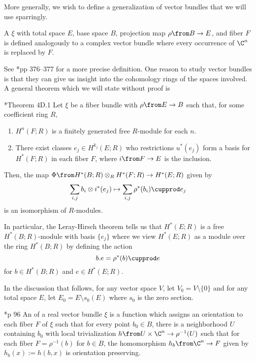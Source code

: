 \documentclass[11pt,leqno,oneside]{amsbook}
\numberwithin{thm}{section}
\begin{document}
More generally, we wish to define a generalization of vector bundles
that we will use sparringly.
\begin{defn}
   A  \(\xi\) with total space \(E\), base space
   \(B\), projection map \(\rho \from B \to E\), and fiber \(F\) is
   defined analogously to a complex vector bundle where every
   occurrence of \(\C^n\) is replaced by \(F\).
\end{defn}
See \cite{hatcher}*{pp 376--377} for a more precise definition. 
One reason to study vector bundles is that they can give us insight
into the cohomology rings of the spaces involved. A general theorem
which we will state without proof is
\begin{thm}
  \cite{hatcher}*{Theorem 4D.1} Let \(\xi\) be a fiber bundle with
  \(\rho \from E \to B\) such that, for some coefficient ring \(R\),
  \begin{enumerate}
  \item \(H^n(F;R)\) is a finitely generated free \(R\)-module for
    each \(n\).
  \item There exist classes \(e_j \in H^{k_j}(E;R)\) who restrictions
    \(u^*(e_j)\) form a basis for \(H^*(F;R)\) in each fiber \(F\),
    where \(i \from F \to E\) is the inclusion.
  \end{enumerate}
  Then, the map \(\Phi \from H^*(B;R) \otimes_R H^*(F;R) \to
  H^*(E;R)\) given by \[
    \sum_{i,j} b_i \otimes i^*(e_j) \mapsto \sum_{i,j} \rho^*(b_i)
    \cupprod e_j
  \]
  is an isomorphism of \(R\)-modules.
\end{thm}
In particular, the Leray-Hirsch theorem tells us that \(H^*(E;R)\) is
a free \(H^*(B;R)\)-module with basis \(\{e_j\}\) where we view
\(H^*(E;R)\) as a module over the ring \(H^*(B;R)\) by defining the
action \[
  b.e = \rho^*(b) \cupprod e
\]
for \(b \in H^*(B;R)\) and \(e \in H^*(E;R)\).
\begin{defn}
  In the discussion that follows, for any vector space \(V\), let
  \(V_0 = V \setminus \{0\}\) and for any total space \(E\), let \(E_0
  = E \setminus s_0(E)\) where \(s_0\) is the zero section.
\end{defn}
\begin{defn}
  \cite{milnor-stasheff}*{p 96} An  of a real vector
  bundle 
  \(\xi\) is a function which assigns an orientation to each fiber
  \(F\) of \(\xi\) such that for every point \(b_0 \in B\), there is a
  neighborhood \(U\) containing \(b_0\) with local
  trivialization \(h \from U \times \C^n \to \rho^{-1}(U)\) such that
  for each fiber \(F = \rho^{-1}(b)\) for \(b \in B\), the
  homomorphism \(h_b \from \C^n \to F\) given by \(h_b(x) := h(b,x)\)
  is orientation preserving. 
\end{defn}
\end{document}
